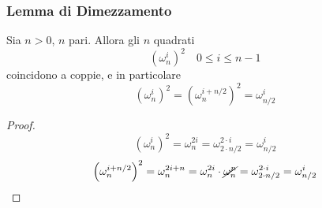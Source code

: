 \subsubsection{Lemma di Dimezzamento}
\begin{lemma}
    Sia $n>0$, $n$ pari. Allora gli $n$ quadrati
    \begin{equation*}
        \left( \omega_{n}^{i} \right)^2 \quad 0 \leq i \leq n-1
    \end{equation*}
    coincidono a coppie, e in particolare
    \begin{equation*}
        \left( \omega_{n}^{i} \right)^2 = 
        \left( \omega_{n}^{i + n/2} \right)^2 = 
        \omega_{n/2}^{i}
    \end{equation*}
    \label{teo:dimezzamento}
\end{lemma}
\begin{proof}
    \begin{equation*}
        \left( \omega_{n}^{i} \right)^2 = 
        \omega_{n}^{2i}  = 
        \omega_{2 \cdot n/2}^{2 \cdot i}  = 
        \omega_{n/2}^{i}
    \end{equation*}
    \begin{equation*}
        \left( \omega_{n}^{i + n/2} \right)^2 = 
        \omega_{n}^{2i+n}  = 
        \omega_{n}^{2i} \cdot
        \cancel{ \omega_{n}^{n} } = 
        \omega_{2 \cdot n/2}^{2 \cdot i}  = 
        \omega_{n/2}^{i}
    \end{equation*}
\end{proof}

